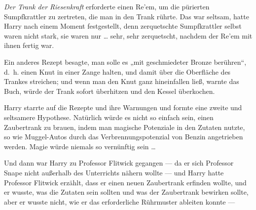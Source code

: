 \emph{Der Trank der Riesenkraft} erforderte einen Re’em, um die pürierten Sumpfkrattler zu zertreten, die man in den Trank rührte. Das war seltsam, hatte Harry nach einem Moment festgestellt, denn zerquetschte Sumpfkrattler selbst waren nicht stark, sie waren nur … sehr, sehr zerquetscht, nachdem der Re’em mit ihnen fertig war.

Ein anderes Rezept besagte, man solle es „mit geschmiedeter Bronze berühren“, d.~h. einen Knut in einer Zange halten, und damit über die Oberfläche des Trankes streichen; und wenn man den Knut ganz hineinfallen ließ, warnte das Buch, würde der Trank sofort überhitzen und den Kessel überkochen.

Harry starrte auf die Rezepte und ihre Warnungen und formte eine zweite und seltsamere Hypothese. Natürlich würde es nicht so einfach sein, einen Zaubertrank zu brauen, indem man magische Potenziale in den Zutaten nutzte, so wie Muggel-Autos durch das Verbrennungspotenzial von Benzin angetrieben werden. Magie würde niemals so vernünftig sein …

Und dann war Harry zu Professor Flitwick gegangen — da er sich Professor Snape nicht außerhalb des Unterrichts nähern wollte — und Harry hatte Professor Flitwick erzählt, dass er einen neuen Zaubertrank erfinden wollte, und er wusste, was die Zutaten sein sollten und was der Zaubertrank bewirken sollte, aber er wusste nicht, wie er das erforderliche Rührmuster ableiten konnte —

